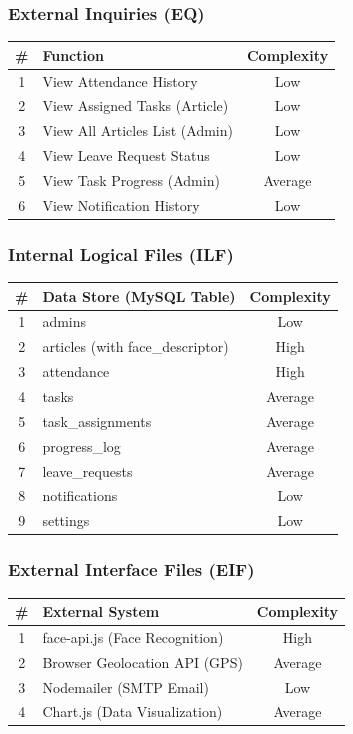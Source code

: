 \documentclass[12pt,a4paper]{article}
\begin{document}
\subsubsection*{External Inquiries (EQ)}
\begin{center}
\begin{tabular}{clc}
\toprule
\textbf{\#} & \textbf{Function} & \textbf{Complexity} \\
\midrule
1 & View Attendance History & Low \\
2 & View Assigned Tasks (Article) & Low \\
3 & View All Articles List (Admin) & Low \\
4 & View Leave Request Status & Low \\
5 & View Task Progress (Admin) & Average \\
6 & View Notification History & Low \\
\bottomrule
\end{tabular}
\end{center}

\subsubsection*{Internal Logical Files (ILF)}
\begin{center}
\begin{tabular}{clc}
\toprule
\textbf{\#} & \textbf{Data Store (MySQL Table)} & \textbf{Complexity} \\
\midrule
1 & admins & Low \\
2 & articles (with face\_descriptor) & High \\
3 & attendance & High \\
4 & tasks & Average \\
5 & task\_assignments & Average \\
6 & progress\_log & Average \\
7 & leave\_requests & Average \\
8 & notifications & Low \\
9 & settings & Low \\
\bottomrule
\end{tabular}
\end{center}

\subsubsection*{External Interface Files (EIF)}
\begin{center}
\begin{tabular}{clc}
\toprule
\textbf{\#} & \textbf{External System} & \textbf{Complexity} \\
\midrule
1 & face-api.js (Face Recognition) & High \\
2 & Browser Geolocation API (GPS) & Average \\
3 & Nodemailer (SMTP Email) & Low \\
4 & Chart.js (Data Visualization) & Average \\
\bottomrule
\end{tabular}
\end{center}
\end{document}
